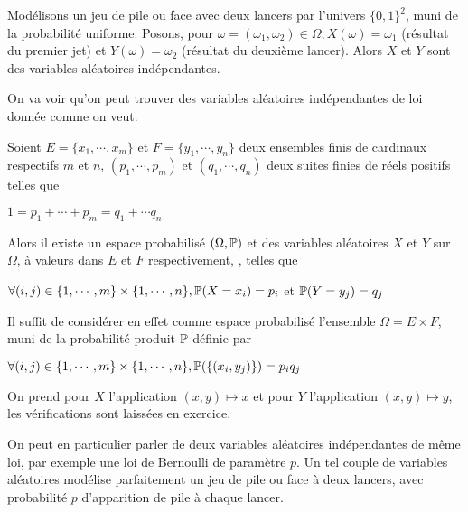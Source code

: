 \documentclass[12pt,a4paper]{report}
\begin{document}
\begin{exemple}{}
Modélisons un jeu de pile ou face avec deux lancers par l'univers $\{0,1\}^2$, muni de la probabilité uniforme. Posons, pour $\omega = (\omega_1,\omega_2) \in \Omega, X(\omega) = \omega_1$ (résultat du premier jet) et $Y(\omega) = \omega_2$ (résultat du deuxième lancer). Alors $X$ et $Y$ sont des variables aléatoires indépendantes.
\end{exemple}

On va voir qu'on peut trouver des variables aléatoires indépendantes de loi donnée comme on veut.

\begin{proposition}{}{}
Soient $E = \{x_1,\cdots,x_m\}$ et $F = \{y_1,\cdots,y_n\}$ deux ensembles finis de cardinaux respectifs $m$ et $n$, $(p_1,\cdots,p_m)$ et $(q_1,\cdots,q_n)$ deux suites finies de réels positifs telles que
\begin{center}
$1 = p_1 + \cdots + p_m = q_1 + \cdots q_n$
\end{center}
Alors il existe un espace probabilisé $(\Omega, \mathbb{P})$ et des variables aléatoires $X$ et $Y$ sur $\Omega$, à valeurs dans $E$ et $F$ respectivement, , telles que 
\begin{center}
$\forall (i,j) \in \{1,\cdots,m\} \times \{1, \cdots,n\}, \mathbb{P}(X=x_i)=p_i$ et $\mathbb{P}(Y=y_j) = q_j$
\end{center}
\end{proposition}

\begin{demo}{}
Il suffit de considérer en effet comme espace probabilisé l'ensemble $\Omega = E \times F$, muni de la probabilité produit $\mathbb{P}$ définie par 
\begin{center}
$\forall (i,j) \in \{1,\cdots,m\} \times \{1,\cdots,n\}, \mathbb{P}(\{(x_i,y_j)\}) = p_iq_j$
\end{center}
On prend pour $X$ l'application $(x,y) \mapsto x$ et pour $Y$ l'application $(x,y) \mapsto y$, les vérifications sont laissées en exercice.
\end{demo}

\begin{remarque}{}
On peut en particulier parler de deux variables aléatoires indépendantes de même loi, par exemple une loi de Bernoulli de paramètre $p$. Un tel couple de variables aléatoires modélise parfaitement un jeu de pile ou face à deux lancers, avec probabilité $p$ d'apparition de pile à chaque lancer.
\end{remarque}
\end{document}
